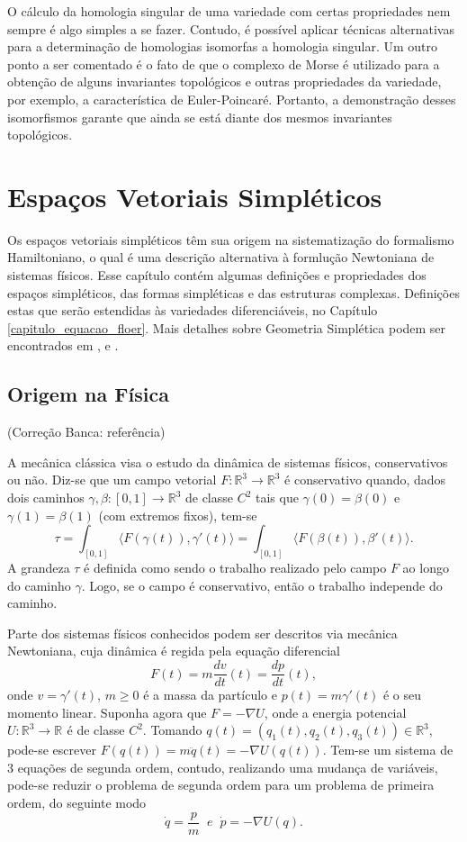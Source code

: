 \documentclass[12pt]{book}
\newcommand{\derivada}[2]{\frac{d #1}{d #2}}
\newcommand{\intervalo}{[0,1]}
\newcommand{\produtointerno}[2]{\langle #1, #2 \rangle}
\newcommand{\real}[1]{\mathbb{R}^{#1}}
\newcommand{\reta}{\real{}}
\newcommand{\alerta}[1]{{\color{red}#1}}
\newcommand{\correcaobanca}[1]{\alerta{(Correção Banca: #1)}}
\begin{document}
	O cálculo da homologia singular de uma variedade com certas propriedades nem sempre é algo simples a se fazer. Contudo, é possível aplicar técnicas alternativas para a determinação de homologias isomorfas a homologia singular. Um outro ponto a ser comentado é o fato de que o complexo de Morse é utilizado para a obtenção de alguns invariantes topológicos e outras propriedades  da variedade, por exemplo, a característica de Euler-Poincaré. Portanto, a demonstração desses isomorfismos garante que ainda se está diante dos mesmos invariantes topológicos.
	
	
	\chapter{Espaços Vetoriais Simpléticos}\label{capitulo_espacos_vetoriais_simpleticos}

	Os espaços vetoriais simpléticos têm sua origem na sistematização do formalismo Hamiltoniano, o qual é uma descrição alternativa à formlução Newtoniana de sistemas físicos. Esse capítulo contém algumas definições e propriedades dos espaços simpléticos, das formas simpléticas e das estruturas complexas. Definições estas que serão estendidas às variedades diferenciáveis, no Capítulo \ref{capitulo_equacao_floer}. Mais detalhes sobre Geometria Simplética podem ser encontrados em \cite{berndt}, \cite{bursztyn_macarini} e \cite{cannas_anna}. 
	
	\section{Origem na Física}
	\correcaobanca{referência}
	
	A mecânica clássica visa o estudo da dinâmica de sistemas físicos, conservativos ou não. Diz-se que um campo vetorial $F:\real{3} \to \real{3}$ é conservativo quando, dados dois caminhos $\gamma,\beta:[0,1] \to \real{3}$ de classe $C^{2}$ tais que $\gamma(0)=\beta(0)$ e $\gamma(1)=\beta(1)$ (com extremos fixos), tem-se
	$$
	\tau=\int_{\intervalo} \produtointerno{F(\gamma(t))}{\gamma'(t)}=
	\int_{\intervalo} \produtointerno{F(\beta(t))}{\beta'(t)}.
	$$
	A grandeza $\tau$ é definida como sendo o trabalho realizado pelo campo $F$ ao longo do caminho $\gamma$. Logo, se o campo é conservativo, então o trabalho independe do caminho.
	
	Parte dos sistemas físicos conhecidos podem ser descritos via mecânica Newtoniana, cuja dinâmica é regida pela equação diferencial 
	$$
	F(t) = m\derivada{v}{t}(t) = \derivada{p}{t}(t),
	$$
	onde $v = \gamma'(t)$, $m\geq0$ é a massa da partículo e $p(t) = m\gamma'(t)$ é o seu momento linear. Suponha agora que $F = -\nabla U$, onde a energia potencial $U:\real{3}\to \reta$ é de classe $C^{2}$. Tomando $q(t)=(q_{1}(t),q_{2}(t), q_{3}(t))\in \real{3}$, pode-se escrever $F(q(t)) =m \ddot{q}(t)= -\nabla U(q(t))$. Tem-se um sistema de 3 equações de segunda ordem, contudo, realizando uma mudança de variáveis, pode-se reduzir o problema de segunda ordem para um problema de primeira ordem, do seguinte modo
	$$
	\dot{q} = \frac{p}{m} \;\; e \;\;\dot{p} = -\nabla U(q).
	$$
	
\end{document}
